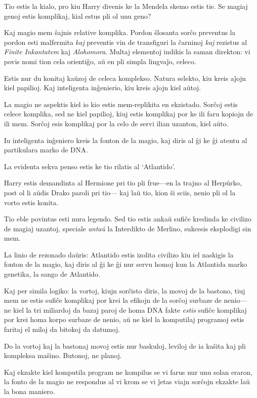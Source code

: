 Tio estis la kialo, pro kiu Harry divenis ke la Mendela skemo estis
tie. Se magiaj genoj estis komplikaj, kial estus pli ol unu geno?

Kaj magio mem ŝajnis relative komplika. Pordon ŝlosanta sorĉo
preventus la pordon esti malfermita \emph{kaj} preventis vin de
transfiguri la ĉarninoj \emph{kaj} rezistus al \emph{Finite
  Inkantatem} kaj \emph{Alohomora}. Multaj elementoj indikis la saman
direkton: vi povis nomi tion cela orientiĝo, aŭ en pli simpla
lingvaĵo, celeco.

Estis nur du konitaj kaŭzoj de celeca komplekso. Natura selekto, kiu
kreis aĵojn kiel papilioj. Kaj inteligenta inĝenierio, kiu kreis aĵojn
kiel aŭtoj.

La magio ne aspektis kiel io kio estis mem-replikita en ekzistado. Sorĉoj
estis celece komplika, sed ne kiel papilioj, kiuj estis komplikaj por
ke ili faru kopiojn de ili mem. Sorĉoj esis komplikaj por la celo de
servi ilian uzanton, kiel aŭto.

Iu inteligenta inĝeniero kreis la fonton de la magio, kaj diris al ĝi
ke ĝi atentu al partikulara marko de DNA.

La evidenta sekva penso estis ke tio rilatis al `Atlantido'.

Harry estis demandinta al Hermione pri tio pli frue—en la trajno al
Herpŭrko, post ol li aŭdis Drako paroli pri tio— kaj laŭ tio, kion ŝi
sciis, nenio pli ol la vorto estis konita.

Tio eble povintus esti nura legendo. Sed tio estis ankaŭ sufiĉe
kredinda ke civilizo de magiaj uzantoj, speciale \emph{antaŭ} la
Interdikto de Merlino, sukcesis eksplodigi sin mem.

La linio de rezonado daŭris: Atlantido estis izolita civilizo kiu iel
naskigis la fonton de la magio, kaj diris al ĝi ke ĝi nur servu homoj
kun la Atlantida marko genetika, la sango de Atlantido.

Kaj per simila logiko: la vortoj, kiujn sorĉisto diris, la movoj de la
bastono, tiuj mem ne estis sufiĉe komplikaj por krei la efikojn de la
sorĉoj surbaze de nenio—ne kiel la tri miliardoj da bazaj paroj de
homa DNA fakte \emph{estis} sufiĉe komplikaj por krei homa korpo
surbaze de nenio, aŭ ne kiel la komputilaj programoj estis faritaj el
miloj da bitokoj da datumoj.

Do la vortoj kaj la bastonaj movoj estis nur baskuloj, leviloj de ia
kaŝita kaj pli kompleksa maŝino. Butonoj, ne planoj.

Kaj ekzakte kiel komputila program ne kompilus se vi farus nur unu
solan eraron, la fonto de la magio ne respondus al vi krom se vi ĵetas
viajn sorĉojn ekzakte laŭ la bona maniero.

